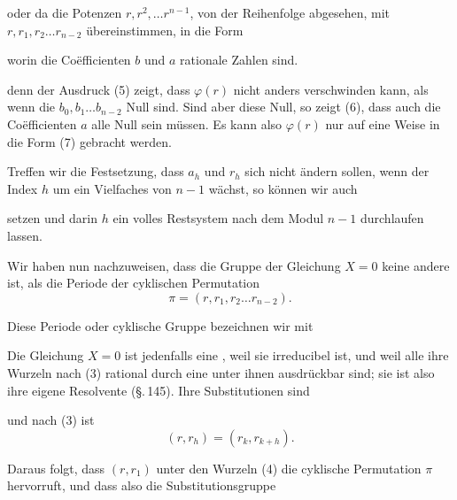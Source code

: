 

oder da die Potenzen $r, r^2, \ldots r^{n-1}$, von der Reihenfolge abgesehen, mit $r, r_1, r_2 \ldots r_{n-2}$ übereinstimmen, in die Form


worin die Coëfficienten $b$ und $a$ rationale Zahlen sind.


denn der Ausdruck (5) zeigt, dass $\varphi(r)$ nicht anders verschwinden kann, als wenn die $b_0, b_1 \ldots b_{n-2}$ Null sind. Sind aber diese Null, so zeigt (6), dass auch die Coëfficienten $a$ alle Null sein müssen. Es kann also $\varphi(r)$ nur auf eine Weise in die Form (7) gebracht werden.

Treffen wir die Festsetzung, dass $a_h$ und $r_h$ sich nicht ändern sollen, wenn der Index $h$ um ein Vielfaches von $n - 1$ wächst, so können wir auch


setzen und darin $h$ ein volles Restsystem nach dem Modul $n - 1$ durchlaufen lassen.

Wir haben nun nachzuweisen, dass die Gruppe der Gleichung $X = 0$ keine andere ist, als die Periode der cyklischen Permutation
\[
\pi = (r, r_1, r_2 \ldots r_{n-2}).
\]

Diese Periode oder cyklische Gruppe bezeichnen wir mit


Die Gleichung $X = 0$ ist jedenfalls eine , weil sie irreducibel ist, und weil alle ihre Wurzeln nach (3) rational durch eine unter ihnen ausdrückbar sind; sie ist also ihre eigene  Resolvente (\S.\,145). Ihre Substitutionen sind


und nach (3) ist
\[
(r, r_h) = (r_k, r_{k+h}).
\]

Daraus folgt, dass $(r, r_1)$ unter den Wurzeln (4) die cyklische Permutation $\pi$ hervorruft, und dass also die Substitutionsgruppe
